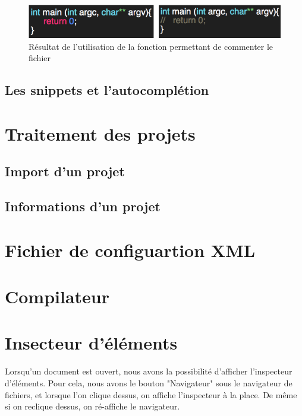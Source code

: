 \documentclass[a4paper,12pt]{article}
\begin{document}
	\begin{figure}[h!]
		\begin{center}
			\includegraphics[scale=0.8]{images/imgs_edit/resultat_commentaire}
			\caption{Résultat de l'utilisation de la fonction permettant de commenter le fichier}
		\end{center}
	\end{figure}
	
\subsection{Les snippets et l'autocomplétion}
	
\section{Traitement des projets}

	\subsection{Import d'un projet}
	
	\subsection{Informations d'un projet}
	
	
\section{Fichier de configuartion XML}


\section{Compilateur}

\section{Insecteur d'éléments}

	Lorsqu'un document est ouvert, nous avons la possibilité d'afficher l'inspecteur d'éléments. Pour cela, nous avons le bouton "Navigateur" sous le navigateur de fichiers, et lorsque l'on clique dessus, on affiche l'inspecteur à la place. De même si on reclique dessus, on ré-affiche le navigateur.
	
\end{document}
